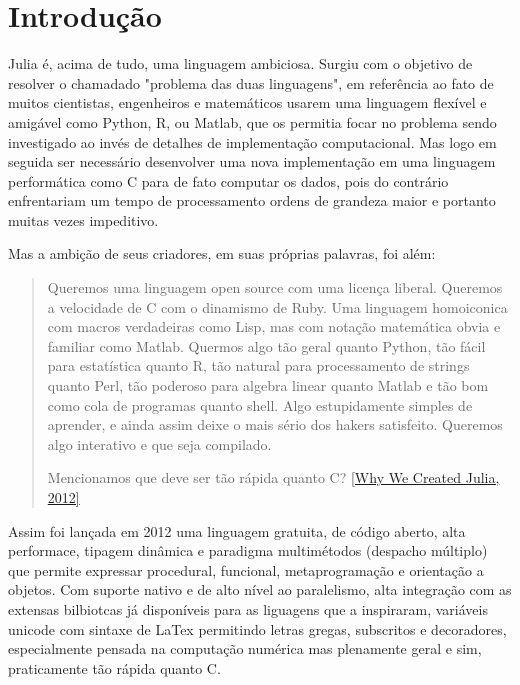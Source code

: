 % 



\chapter{ Introdu\c{c}\~{a}o}

Julia é, acima de tudo, uma linguagem ambiciosa. 
Surgiu com o objetivo de resolver o chamadado "problema das duas linguagens", em referência ao fato de muitos cientistas, engenheiros e matemáticos usarem uma linguagem flexível e amigável como Python, R, ou Matlab, que os permitia focar no problema sendo investigado ao invés de detalhes de implementação computacional.
Mas logo em seguida ser necessário desenvolver uma nova implementação em uma linguagem performática como C para de fato computar os dados, pois do contrário enfrentariam um tempo de processamento ordens de grandeza maior e portanto muitas vezes impeditivo. \cite{Lauwens2019}

Mas a ambição de seus criadores, em suas próprias palavras, foi além:

\begin{quote}
   Queremos uma linguagem open source com uma licença liberal. Queremos a velocidade de C com o dinamismo de Ruby. Uma linguagem homoiconica com macros verdadeiras como Lisp, mas com notação matemática obvia e familiar como Matlab. Quermos algo tão geral quanto Python, tão fácil para estatística quanto R, tão natural para processamento de strings quanto Perl, tão poderoso para algebra linear quanto Matlab e tão bom como cola de programas quanto shell. Algo estupidamente simples de aprender, e ainda assim deixe o mais sério dos hakers satisfeito. Queremos algo interativo e que seja compilado. 
   
   Mencionamos que deve ser tão rápida quanto C? 
   \href{https://julialang.org/blog/2012/02/why-we-created-julia/}{[Why We Created Julia, 2012]}
   
   
\end{quote}

Assim foi lançada em 2012 uma linguagem gratuita, de código aberto, alta performace, tipagem dinâmica e paradigma multimétodos (despacho múltiplo) que permite expressar procedural, funcional, metaprogramação e orientação a objetos. Com suporte nativo e de alto nível ao paralelismo, alta integração com as extensas bilbiotcas já disponíveis para as liguagens que a inspiraram, variáveis unicode com sintaxe de LaTex permitindo letras gregas, subscritos e decoradores, especialmente pensada na computação numérica mas plenamente geral e sim, praticamente tão rápida quanto C. \cite{Lobianco2019,Bezanson2017}





